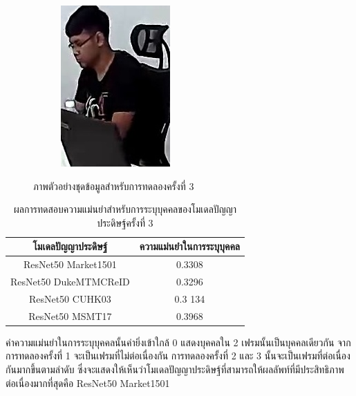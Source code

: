 \begin{figure}[!ht]
\begin{subfigure}[b]{0.2\textwidth}
        \includegraphics[width=\textwidth]{chapter4/images/fei_1.jpg}
        \label{fig:ex_6}
    \end{subfigure}
    \caption{ภาพตัวอย่างชุดข้อมูลสำหรับการทดลองครั้งที่ 3}
    \label{fig: ภาพตัวอย่างชุดข้อมูลสำหรับการทดลอง 3}
\end{figure}
\begin{table}[!ht]
\centering
\begin{tabular}{|c|c|}
		\hline
		{โมเดลปัญญาประดิษฐ์}&{ความแม่นยำในการระบุบุคคล}							\\
		\hline
		ResNet50 Market1501	 			& 0.3308								\\
		ResNet50 DukeMTMCReID			& 0.3296								\\
		ResNet50 CUHK03				& 0.3	134								\\
		ResNet50 MSMT17				& 0.3968								\\
	\hline
\end{tabular}
\caption{ผลการทดสอบความแม่นยำสำหรับการระบุบุคคลของโมเดลปัญญาประดิษฐ์ครั้งที่ 3}
\label{tab: Original distant of image 3}
\end{table}
ค่าความแม่นยำในการระบุบุคคลนั้นค่ายิ่งเข้าใกล้ 0 แสดงบุคคลใน 2 เฟรมนั้นเป็นบุคคลเดียวกัน จากการทดลองครั้งที่ 1 จะเป็นเฟรมที่ไม่ต่อเนื่องกัน การทดลองครั้งที่ 2 และ 3 นั้นจะเป็นเฟรมที่ต่อเนื่องกันมากขึ้นตามลำดับ ซึ่งจะแสดงให้เห็นว่าโมเดลปัญญาประดิษฐ์ที่สามารถให้ผลลัพท์ที่มีประสิทธิภาพต่อเนื่องมากที่สุดคือ ResNet50 Market1501
